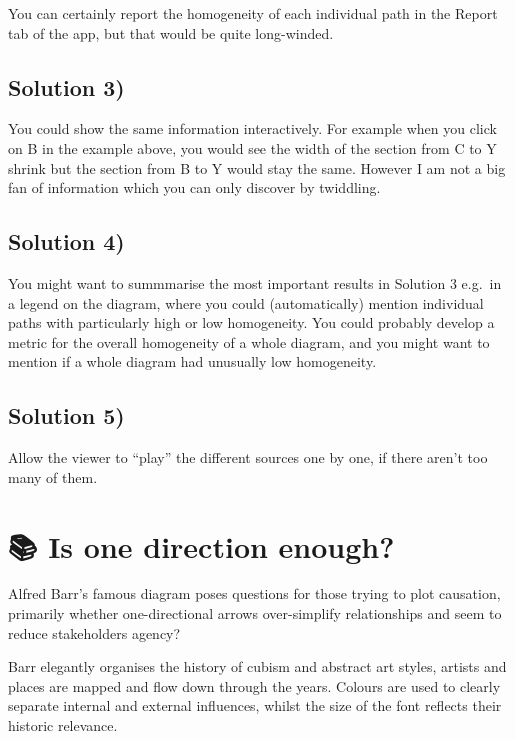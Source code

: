 \documentclass[
]{book}
\begin{document}
You can certainly report the homogeneity of each individual path in the Report tab of the app, but that would be quite long-winded.

\hypertarget{solution-3}{%
\section{Solution 3)}\label{solution-3}}

You could show the same information interactively. For example when you click on B in the example above, you would see the width of the section from C to Y shrink but the section from B to Y would stay the same. However I am not a big fan of information which you can only discover by twiddling.

\hypertarget{solution-4}{%
\section{Solution 4)}\label{solution-4}}

You might want to summmarise the most important results in Solution 3 e.g.~in a legend on the diagram, where you could (automatically) mention individual paths with particularly high or low homogeneity. You could probably develop a metric for the overall homogeneity of a whole diagram, and you might want to mention if a whole diagram had unusually low homogeneity.

\hypertarget{solution-5}{%
\section{Solution 5)}\label{solution-5}}

Allow the viewer to ``play'' the different sources one by one, if there aren't too many of them.

\hypertarget{is-one-direction-enough}{%
\chapter{📚 Is one direction enough?}\label{is-one-direction-enough}}

Alfred Barr's famous diagram poses questions for those trying to plot causation, primarily whether one-directional arrows over-simplify relationships and seem to reduce stakeholders agency?

Barr elegantly organises the history of cubism and abstract art styles, artists and places are mapped and flow down through the years. Colours are used to clearly separate internal and external influences, whilst the size of the font reflects their historic relevance.
\end{document}
